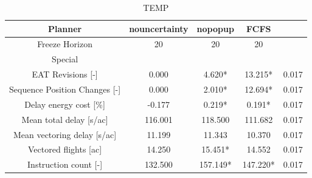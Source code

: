\begin{table}[htbp]
\caption{TEMP}
\begin{center}
\footnotesize
\setlength{\tabcolsep}{3pt}
\renewcommand{\arraystretch}{1.000}
\begin{tabular}{|c|c|c|c|c|}
\hline
Planner & nouncertainty & nopopup & FCFS &  \\
\hline
Freeze Horizon & 20 & 20 & 20 &  \\
\hline
Special &  &  &  &  \\
\hline
EAT Revisions [-] & 0.000 & 4.620* & 13.215* & 0.017 \\
\hline
Sequence Position Changes [-] & 0.000 & 2.010* & 12.694* & 0.017 \\
\hline
Delay energy cost [\%] & -0.177 & 0.219* & 0.191* & 0.017 \\
\hline
Mean total delay [s/ac] & 116.001 & 118.500 & 111.682 & 0.017 \\
\hline
Mean vectoring delay [s/ac] & 11.199 & 11.343 & 10.370 & 0.017 \\
\hline
Vectored flights [ac] & 14.250 & 15.451* & 14.552 & 0.017 \\
\hline
Instruction count [-] & 132.500 & 157.149* & 147.220* & 0.017 \\
\hline
\end{tabular}
\label{tab:temp}
\end{center}
\end{table}